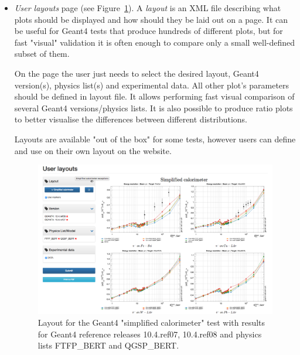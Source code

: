 \begin{itemize}
\item \textit{User layouts} page (see Figure~\ref{fig:layouts}). A \textit{layout} is an XML file describing what plots should be displayed and how should they be laid out on a page. It can be useful for Geant4 tests that produce hundreds of different plots, but for fast "visual" validation it is often enough to compare only a small well-defined subset of them. 

On the page the user just needs to select the desired layout, Geant4 version(s), physics list(s) and experimental data. All other plot's parameters should be defined in layout file. It allows performing fast visual comparison of several Geant4 versions/physics lists. It is also possible to produce ratio plots to better visualise the differences between different distributions.

Layouts are available "out of the box" for some tests, however users can define and use on their own layout on the website.

\begin{figure}[h]
    \centering
    \includegraphics[width=\textwidth,clip]{layout_sc.png}
    \caption{Layout for the Geant4 "simplified calorimeter" test with results for Geant4 reference releases 10.4.ref07, 10.4.ref08 and physics lists FTFP\_BERT and QGSP\_BERT.}
    \label{fig:layouts}
\end{figure}

\end{itemize}

